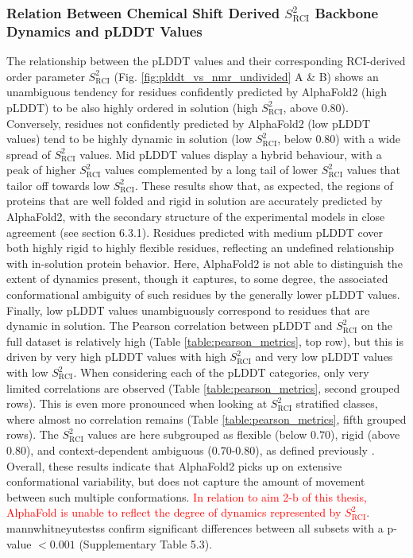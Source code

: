 \subsubsection{Relation Between Chemical Shift Derived $S^{2}_{\text{RCI}}$ Backbone Dynamics and pLDDT Values}

The relationship between the pLDDT values and their corresponding RCI-derived order parameter $S^{2}_{\text{RCI}}$ (Fig. \ref{fig:plddt_vs_nmr_undivided} A \& B) shows an unambiguous tendency for residues confidently predicted by AlphaFold2 (high pLDDT) to be also highly ordered in solution (high $S^{2}_{\text{RCI}}$, above 0.80). Conversely, residues not confidently predicted by AlphaFold2 (low pLDDT values) tend to be highly dynamic in solution (low $S^{2}_{\text{RCI}}$, below 0.80) with a wide spread of $S^{2}_{\text{RCI}}$ values. Mid pLDDT values display a hybrid behaviour, with a peak of higher $S^{2}_{\text{RCI}}$ values complemented by a long tail of lower $S^{2}_{\text{RCI}}$ values that tailor off towards low $S^{2}_{\text{RCI}}$. These results show that, as expected, the regions of proteins that are well folded and rigid in solution are accurately predicted by AlphaFold2, with the secondary structure of the experimental models in close agreement (see section 6.3.1). Residues predicted with medium pLDDT cover both highly rigid to highly flexible residues, reflecting an undefined relationship with in-solution protein behavior. Here, AlphaFold2 is not able to distinguish the extent of dynamics present, though it captures, to some degree, the associated conformational ambiguity of such residues by the generally lower pLDDT values. Finally, low pLDDT values unambiguously correspond to residues that are dynamic in solution. The Pearson correlation between pLDDT and $S^{2}_{\text{RCI}}$ on the full dataset is relatively high (Table \ref{table:pearson_metrics}, top row), but this is driven by very high pLDDT values with high $S^{2}_{\text{RCI}}$ and very low pLDDT values with low $S^{2}_{\text{RCI}}$. When considering each of the pLDDT categories, only very limited correlations are observed (Table \ref{table:pearson_metrics}, second grouped rows). This is even more pronounced when looking at $S^{2}_{\text{RCI}}$ stratified classes, where almost no correlation remains (Table \ref{table:pearson_metrics}, fifth grouped rows). The \(S^{2}_{\text{RCI}}\) values are here subgrouped as flexible (below $0.70$), rigid (above $0.80$), and context-dependent ambiguous ($0.70$-$0.80$), as defined previously \cite{cilia_dynamine_2014}. Overall, these results indicate that AlphaFold2 picks up on extensive conformational variability, but does not capture the amount of movement between such multiple conformations. \textcolor{red}{In relation to aim 2-b of this thesis, AlphaFold is unable to reflect the degree of dynamics represented by $S^{2}_{\text{RCI}}$}. \glspl{mannwhitneyutest}s confirm significant differences between all subsets with a p-value \( < 0.001 \) (Supplementary Table 5.3).

